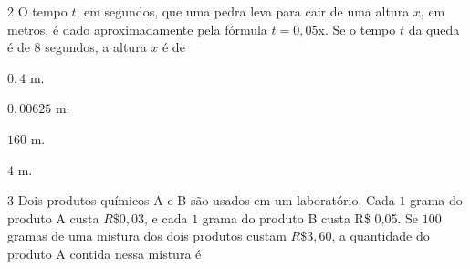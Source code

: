 
\num{2}  O tempo $t$, em segundos, que uma pedra leva para cair de uma altura $x$,
em metros, é dado aproximadamente pela fórmula $t = 0,05$x. Se o tempo $t$
da queda é de $8$ segundos, a altura $x$ é de

\begin{escolha}
\item $0,4$ m.
\item $0,00625$ m.
\item $160$ m.
\item $4$ m.
\end{escolha}



\num{3}  Dois produtos químicos A e B são usados em um laboratório. Cada $1$ grama
do produto A custa $R\$ 0,03$, e cada $1$ grama do produto B custa R\$ 0,05.
Se $100$ gramas de uma mistura dos dois produtos custam $R\$ 3,60$, a
quantidade do produto A contida nessa mistura é

